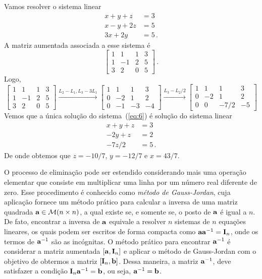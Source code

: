 \documentclass[12pt,a4paper]{article}
\newcommand{\dsqr}[1]{\left[#1\right]}
\theoremstyle{definition}
\begin{document}
Vamos resolver o sistema linear
\begin{equation}
  \label{eq:6}
  \begin{split}
    x+y+z&=3\\
    x-y+2z&=5\\
    3x+2y&=5\,.
  \end{split}
\end{equation}
A matriz aumentada associada a esse sistema é
$$\dsqr{
  \begin{array}{rrrr}
    1&1&1&3\\
    1&-1&2&5\\
    3&2&0&5
  \end{array}
}\,.$$ Logo,
$$\dsqr{
  \begin{array}{rrrr}
    1&1&1&3\\
    1&-1&2&5\\
    3&2&0&5
  \end{array}
}\xrightarrow{L_2-L_1, L_3-3L_1}\dsqr{
  \begin{array}{rrrr}
    1&1&1&3\\
    0&-2&1&2\\
    0&-1&-3&-4
  \end{array}
}\xrightarrow{L_3-L_2/2} \dsqr{
  \begin{array}{rrrr}
    1&1&1&3\\
    0&-2&1&2\\
    0&0&-7/2&-5
  \end{array}
}$$ Vemos que a única solução do sistema~(\ref{eq:6}) é solução do
sistema linear
\begin{equation*}
  \begin{split}
    x+y+z&=3\\
    -2y+z&=2\\
    -7z/2&=5\,.
  \end{split}
\end{equation*}
De onde obtemos que $z=-10/7$, $y=-12/7$ e $x=43/7$.

O processo de eliminação pode ser estendido considerando mais uma
operação elementar que consiste em multiplicar uma linha por um número
real diferente de zero. Esse procedimento é conhecido como
\textit{método de Gauss-Jordan}, cuja aplicação fornece um método
prático para calcular a inversa de uma matriz quadrada
${\bf a}\in{\cal M}(n\times n)$, a qual existe se, e somente se, o
posto de ${\bf a}$ é igual a $n$. De fato, encontrar a inversa de
${\bf a}$ equivale a resolver $n$ sistemas de $n$ equações lineares,
os quais podem ser escritos de forma compacta como
${\bf aa}^{-1}={\bf I}_n$, onde os termos de ${\bf a}^{-1}$ são as
incógnitas. O método prático para encontrar ${\bf a}^{-1}$ é
considerar a matriz aumentada $[{\bf a}, {\bf I}_n]$ e aplicar o
método de Gauss-Jordan com o objetivo de obtermos a matriz
$[{\bf I}_n,{\bf b}]$. Dessa maneira, a matriz ${\bf a}^{-1}$, deve
satisfazer a condição ${\bf I}_n{\bf a}^{-1}={\bf b}$, ou seja,
${\bf a}^{-1}={\bf b}$.
\end{document}
